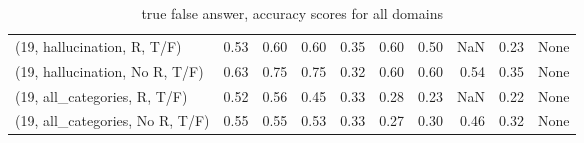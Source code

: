 \begin{table*}[h!]
\begin{adjustbox}{width=2\columnwidth,center}
\begin{tabular}{lrrr|rrr|rrr}
(19, hallucination, R, T/F)           &                      0.53 &                  0.60 &                      0.60 &                          0.35 &                      0.60 &                          0.50 &                                    NaN &                               0.23 &                                  None \\
(19, hallucination, No R, T/F)        &                      0.63 &                  0.75 &                      0.75 &                          0.32 &                      0.60 &                          0.60 &                                   0.54 &                               0.35 &                                  None \\
(19, all\_categories, R, T/F)          &                      0.52 &                  0.56 &                      0.45 &                          0.33 &                      0.28 &                          0.23 &                                    NaN &                               0.22 &                                  None \\
(19, all\_categories, No R, T/F)       &                      0.55 &                  0.55 &                      0.53 &                          0.33 &                      0.27 &                          0.30 &                                   0.46 &                               0.32 &                                  None \\


\bottomrule
\end{tabular}
\end{adjustbox}
\caption{true false answer, accuracy scores for all domains}
\end{table*}